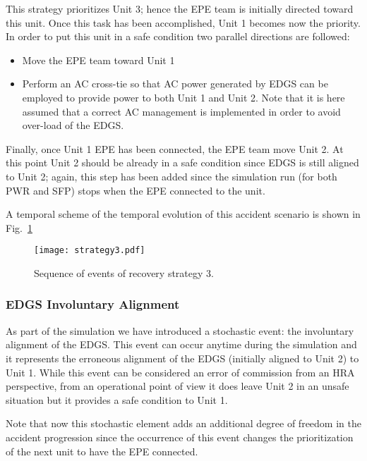 This strategy prioritizes Unit 3; hence the EPE team is initially directed toward this unit. 
Once this task has been accomplished, Unit 1 becomes now the priority. In order to put this unit in a safe 
condition two parallel directions are followed: 

\begin{itemize}
  \item Move the EPE team toward Unit 1 
  \item Perform an AC cross-tie so that AC power generated by EDGS can be employed to provide power to both Unit
        1 and Unit 2. Note that it is here assumed that a correct AC management is implemented in order to avoid
        over-load of the EDGS.
\end{itemize}

Finally, once Unit 1 EPE has been connected, the EPE team move Unit 2. At this point Unit 2 should be already in a 
safe condition since EDGS is still aligned to Unit 2; again, this step has been added since the simulation run (for 
both PWR and SFP) stops when the EPE connected to the unit.

A temporal scheme of the temporal evolution of this accident scenario is shown in Fig.~\ref{fig:strategy3Scheme}

\begin{figure}
    \centering
    \centerline{\texttt{[image: strategy3.pdf]}}
    \caption{Sequence of events of recovery strategy 3.}
    \label{fig:strategy3Scheme}
\end{figure}

\subsubsection{EDGS Involuntary Alignment}
\label{sec:EDGSinvolAlign}

As part of the simulation we have introduced a stochastic event: the involuntary alignment of the EDGS.
This event can occur anytime during the simulation and it represents the erroneous alignment of the EDGS 
(initially aligned to Unit 2) to Unit 1. 
While this event can be considered an error of commission from an HRA perspective, from an operational point of view 
it does leave Unit 2 in an unsafe situation but it provides a safe condition to Unit 1. 

Note that now this stochastic element adds an additional degree of freedom in the accident progression since the 
occurrence of this event changes the prioritization of the next unit to have the EPE connected.

